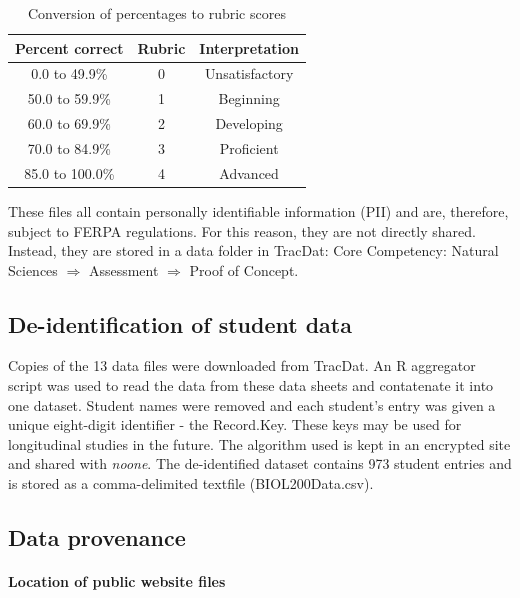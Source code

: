 \documentclass[fleqn,10pt]{SelfArx}\usepackage[]{graphicx}\usepackage[]{color}
\begin{document}
\begin{table}[hbt]
\caption{Conversion of percentages to rubric scores}
\centering
\begin{tabular}{c c c}
\textbf{Percent correct} & \textbf{Rubric} & \textbf{Interpretation}   \\
\hline
 0.0 to 49.9\%   &   0   &   Unsatisfactory                                \\
50.0 to 59.9\%   &   1   &   Beginning                                     \\
60.0 to 69.9\%   &   2   &   Developing                                    \\
70.0 to 84.9\%   &   3   &   Proficient                                    \\
85.0 to 100.0\%  &   4   &   Advanced                                      \\
\end{tabular}
\label{tab:convert}
\end{table}

These files all contain personally identifiable information (PII) and are, therefore, subject to FERPA regulations. For this reason, they are not directly shared. Instead, they are stored in a data folder in TracDat: Core Competency: Natural Sciences $\Rightarrow$ Assessment $\Rightarrow$ Proof of Concept.

\subsection{De-identification of student data}
Copies of the 13 data files were downloaded from TracDat. An R aggregator script was used to read the data from these data sheets and contatenate it into one dataset. Student names were removed and each student's entry was given a unique eight-digit identifier - the Record.Key. These keys may be used for longitudinal studies in the future. The algorithm used is kept in an encrypted site and shared with \textit{noone}. The de-identified dataset contains 973 student entries and is stored as a comma-delimited textfile (BIOL200Data.csv).

\subsection{Data provenance}
\paragraph{Location of public website files} \lipsum[1] %
\end{document}
